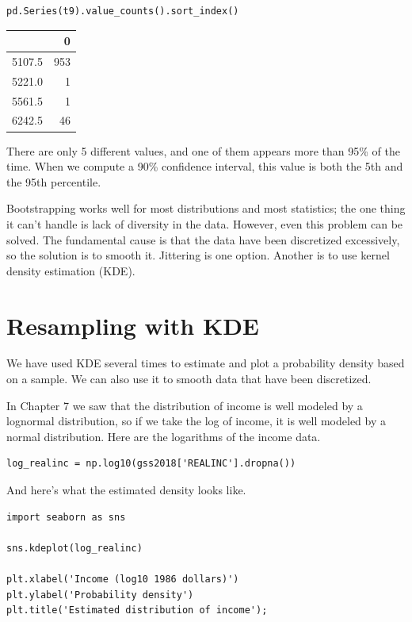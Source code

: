 \begin{lstlisting}[]
pd.Series(t9).value_counts().sort_index()
\end{lstlisting}

\begin{tabular}{lr}
\midrule
{} &    0 \\
\midrule
5107.5 &  953 \\
5221.0 &    1 \\
5561.5 &    1 \\
6242.5 &   46 \\
\midrule
\end{tabular}

There are only 5 different values, and one of them appears more than
95\% of the time. When we compute a 90\% confidence interval, this value
is both the 5th and the 95th percentile.

Bootstrapping works well for most distributions and most statistics; the
one thing it can't handle is lack of diversity in the data. However,
even this problem can be solved. The fundamental cause is that the data
have been discretized excessively, so the solution is to smooth it.
Jittering is one option. Another is to use kernel density estimation
(KDE).

\hypertarget{resampling-with-kde}{%
\section{Resampling with KDE}\label{resampling-with-kde}}

We have used KDE several times to estimate and plot a probability
density based on a sample. We can also use it to smooth data that have
been discretized.

In Chapter 7 we saw that the distribution of income is well modeled by a
lognormal distribution, so if we take the log of income, it is well
modeled by a normal distribution. Here are the logarithms of the income
data.

\begin{lstlisting}[]
log_realinc = np.log10(gss2018['REALINC'].dropna())
\end{lstlisting}

And here's what the estimated density looks like.

\begin{lstlisting}[]
import seaborn as sns

sns.kdeplot(log_realinc)

plt.xlabel('Income (log10 1986 dollars)')
plt.ylabel('Probability density')
plt.title('Estimated distribution of income');
\end{lstlisting}

